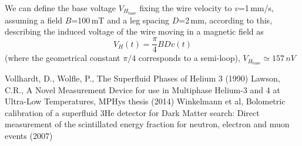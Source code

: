 \documentclass[a4paper,12pt]{article}
\begin{document}
We can define the base voltage $V_{H_{\mathrm{base}}}$ fixing the wire velocity to $v$=1\,mm/s, assuming a field $B$=100\,mT and a leg spacing $D$=2\,mm, according to this, describing the induced voltage of the wire moving in a magnetic field as
\begin{equation}
V_H(t) = \frac{\pi}{4} B D v(t)
\end{equation}
(where the geometrical constant $\pi/4$ corresponds to a semi-loop), $V_{H_{\mathrm{base}}} \simeq 157\,nV$ 




\pagebreak
\newpage

\begin{thebibliography}{9}

 Vollhardt, D., Wolfle, P., The Superfluid Phases of Helium 3 (1990)
 Lawson, C.R., A Novel Measurement Device for use in Multiphase Helium-3 and 4 at Ultra-Low Temperatures, MPHys thesis (2014)
 Winkelmann et al, Bolometric calibration of a superfluid 3He detector for Dark Matter search: Direct measurement of the scintillated energy fraction for
neutron, electron and muon events (2007)

\end{thebibliography}
\end{document}
